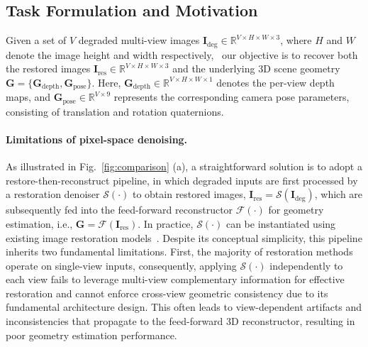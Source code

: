\documentclass{llmxive}
\begin{document}


\subsection{Task Formulation and Motivation}

Given a set of $V$ degraded multi-view images $\mathbf{I}_{\text{deg}} \in \mathbb{R}^{V \times H \times W \times 3}$, where $H$ and $W$ denote the image height and width respectively, \ our objective is to recover both the restored images $\mathbf{I}_{\text{res}} \in \mathbb{R}^{V \times H \times W \times 3}$ and the underlying 3D scene geometry $\mathbf{G} = \{\mathbf{G}_\text{depth}, \mathbf{G}_\text{pose}\}$. Here, $\mathbf{G}_\text{depth} \in \mathbb{R}^{V \times H \times W \times 1}$ denotes the per-view depth maps, and $\mathbf{G}_\text{pose} \in \mathbb{R}^{V \times 9}$ represents the corresponding camera pose parameters, consisting of translation and rotation quaternions.



\paragraph{Limitations of pixel-space denoising.}
As illustrated in Fig.~\ref{fig:comparison} (a), a straightforward solution is to adopt a {restore-then-reconstruct} pipeline, in which degraded inputs are first processed by a restoration denoiser $\mathcal{S}(\cdot)$ to obtain restored images, $\mathbf{I}_{\text{res}} = \mathcal{S}(\mathbf{I}_{\text{deg}})$, which are subsequently fed into the feed-forward reconstructor $\mathcal{F}(\cdot)$ for geometry estimation, i.e., $\mathbf{G} = \mathcal{F}(\mathbf{I}_{\text{res}})$. In practice, $\mathcal{S}(\cdot)$ can be instantiated using existing image restoration models~\cite{zamir2022restormer, chen2023hierarchical, conde2024high, zamfir2024complexityexperts, liang2024vrt, Youk_2024_CVPR}. Despite its conceptual simplicity, this pipeline inherits two fundamental limitations. First, the majority of restoration methods operate on single-view inputs, consequently, applying $\mathcal{S}(\cdot)$ independently to each view fails to leverage multi-view complementary information for effective restoration and cannot enforce cross-view geometric consistency due to its fundamental architecture design. This often leads to view-dependent artifacts and inconsistencies that propagate to the feed-forward 3D reconstructor, resulting in poor geometry estimation performance. 
\end{document}
